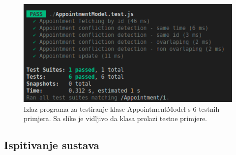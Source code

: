                 \begin{figure}[H]
                    \includegraphics[width=\textwidth]{slike/appointment_tests_out.png} %
                    \caption{Izlaz programa za testiranje klase AppointmentModel s 6 testnih primjera. Sa slike je vidljivo da klasa prolazi testne primjere.}
                    \label{fig:struktura} %
                \end{figure}
			
			
			
			\subsection{Ispitivanje sustava}
			
